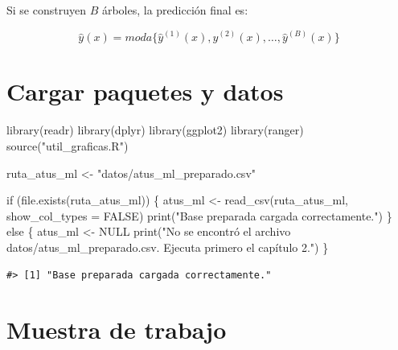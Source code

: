 \documentclass[
  spanish,
  10.5pt,
  letterpaper,
  openany,
  headings=big]{scrbook}
\newenvironment{Shaded}{}{}
\newcommand{\AttributeTok}[1]{\textcolor[rgb]{0.84,0.23,0.29}{#1}}
\newcommand{\ConstantTok}[1]{\textcolor[rgb]{0.00,0.36,0.77}{#1}}
\newcommand{\ControlFlowTok}[1]{\textcolor[rgb]{0.84,0.23,0.29}{#1}}
\newcommand{\FunctionTok}[1]{\textcolor[rgb]{0.44,0.26,0.76}{#1}}
\newcommand{\NormalTok}[1]{\textcolor[rgb]{0.14,0.16,0.18}{#1}}
\newcommand{\OtherTok}[1]{\textcolor[rgb]{0.44,0.26,0.76}{#1}}
\newcommand{\StringTok}[1]{\textcolor[rgb]{0.01,0.18,0.38}{#1}}
\begin{document}
Si se construyen \(B\) árboles, la predicción final es:

\[
\hat{y}(x) = moda\{\hat{y}^{(1)}(x), \hat{y}^{(2)}(x), \ldots, \hat{y}^{(B)}(x)\}
\]

\section{Cargar paquetes y datos}\label{cargar-paquetes-y-datos-2}

\begin{Shaded}
\begin{Highlighting}[]
\FunctionTok{library}\NormalTok{(readr)}
\FunctionTok{library}\NormalTok{(dplyr)}
\FunctionTok{library}\NormalTok{(ggplot2)}
\FunctionTok{library}\NormalTok{(ranger)}
\FunctionTok{source}\NormalTok{(}\StringTok{"util\_graficas.R"}\NormalTok{)}

\NormalTok{ruta\_atus\_ml }\OtherTok{\textless{}{-}} \StringTok{"datos/atus\_ml\_preparado.csv"}

\ControlFlowTok{if}\NormalTok{ (}\FunctionTok{file.exists}\NormalTok{(ruta\_atus\_ml)) \{}
\NormalTok{  atus\_ml }\OtherTok{\textless{}{-}} \FunctionTok{read\_csv}\NormalTok{(ruta\_atus\_ml, }\AttributeTok{show\_col\_types =} \ConstantTok{FALSE}\NormalTok{)}
  \FunctionTok{print}\NormalTok{(}\StringTok{"Base preparada cargada correctamente."}\NormalTok{)}
\NormalTok{\} }\ControlFlowTok{else}\NormalTok{ \{}
\NormalTok{  atus\_ml }\OtherTok{\textless{}{-}} \ConstantTok{NULL}
  \FunctionTok{print}\NormalTok{(}\StringTok{"No se encontró el archivo datos/atus\_ml\_preparado.csv. Ejecuta primero el capítulo 2."}\NormalTok{)}
\NormalTok{\}}
\end{Highlighting}
\end{Shaded}

\begin{verbatim}
#> [1] "Base preparada cargada correctamente."
\end{verbatim}

\section{Muestra de trabajo}\label{muestra-de-trabajo}
\end{document}
